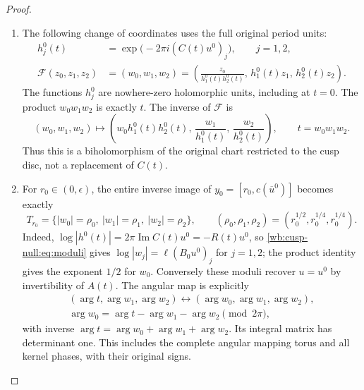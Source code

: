 \begin{proof}
\begin{enumerate}[label=\arabic*.,leftmargin=*]
\item The following change of coordinates uses the full original period units:
\begin{align}
 h_j^0(t)&=\exp\bigl(-2\pi i(C(t)u^0)_j\bigr),\qquad j=1,2,\\
 \mathcal F(z_0,z_1,z_2)
 &=(w_0,w_1,w_2)
 =\left(\frac{z_0}{h_1^0(t)h_2^0(t)},\,
 h_1^0(t)z_1,\,h_2^0(t)z_2\right).
 \label{wb:cusp-null:eq:straightening}
\end{align}
The functions \(h_j^0\) are nowhere-zero holomorphic units, including
at \(t=0\). The product \(w_0w_1w_2\) is exactly \(t\).
The inverse of \(\mathcal F\) is
\[
 (w_0,w_1,w_2)\longmapsto
 \left(w_0h_1^0(t)h_2^0(t),\,
 \frac{w_1}{h_1^0(t)},\,\frac{w_2}{h_2^0(t)}\right),
 \qquad t=w_0w_1w_2.
\]
Thus this is a biholomorphism of the original chart restricted to the
cusp disc, not a replacement of \(C(t)\).

\item For \(r_0\in(0,\epsilon)\), the entire inverse image of
\(y_0=[r_0,c(\overline u^0)]\) becomes exactly
\begin{equation}
 T_{r_0}=
 \{|w_0|=\rho_0,\ |w_1|=\rho_1,\ |w_2|=\rho_2\},\qquad
 (\rho_0,\rho_1,\rho_2)=
 (r_0^{1/2},r_0^{1/4},r_0^{1/4}).
 \label{wb:cusp-null:eq:torus}
\end{equation}
Indeed, \(\log|h^0(t)|=2\pi\operatorname{Im}C(t)u^0=-R(t)u^0\),
so \eqref{wb:cusp-null:eq:moduli} gives \(\log|w_j|=\ell(B_0u^0)_j\) for
\(j=1,2\); the product identity gives the exponent \(1/2\) for
\(w_0\). Conversely these moduli recover \(u=u^0\) by invertibility
of \(A(t)\). The angular map is explicitly
\label{qa:III:layout:1}
\[
\begin{gathered}
 (\arg t,\arg w_1,\arg w_2)\longleftrightarrow
 (\arg w_0,\arg w_1,\arg w_2),\\
 \arg w_0=\arg t-\arg w_1-\arg w_2\pmod{2\pi},
\end{gathered}
\]
with inverse \(\arg t=\arg w_0+\arg w_1+\arg w_2\).
Its integral matrix has determinant one. This includes the complete
angular mapping torus and all kernel phases, with their original signs.


\end{enumerate}
\end{proof}
